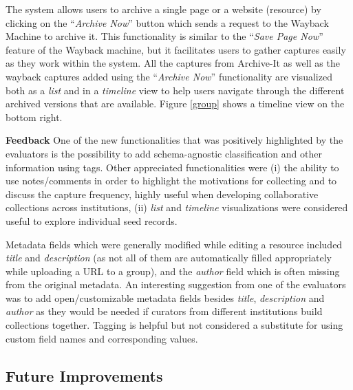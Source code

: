 \documentclass{llncs}
\begin{document}
The system allows users to archive a single page or a website
(resource) by clicking on the ``\textit{Archive Now}'' button which
sends a request to the Wayback Machine to archive it. This
functionality is similar to the ``\textit{Save Page Now}'' feature of
the Wayback machine, but it facilitates users to gather captures
easily as they work within the system. All the captures from
Archive-It as well as the wayback captures added using the
``\textit{Archive Now}'' functionality are visualized both as a
\textit{list} and in a \textit{timeline} view to help users navigate
through the different archived versions that are available. Figure
\ref{group} shows a timeline view on the bottom right.

\textbf{Feedback} One of the new functionalities that was positively
highlighted by the evaluators is the possibility to add
schema-agnostic classification and other information using tags.
Other appreciated functionalities were (i) the ability to use notes/comments in order to highlight the motivations for collecting and
to discuss the capture frequency, highly useful when
developing collaborative collections across institutions, (ii) \textit{list} and \textit{timeline} visualizations were
considered useful to explore individual seed records.

Metadata fields which were generally modified while editing a resource included
\textit{title} and \textit{description} (as not all of them are 
automatically filled appropriately while uploading a URL to a group),
and the \textit{author} field which is often missing from the original
metadata. An interesting suggestion from one of the evaluators was to add open/customizable
metadata fields besides \textit{title}, \textit{description} and
\textit{author} as they would be needed if curators from different
institutions build collections together. Tagging is helpful but not
considered a substitute for using custom field names and corresponding
values.

\subsection{Future Improvements}
\end{document}
